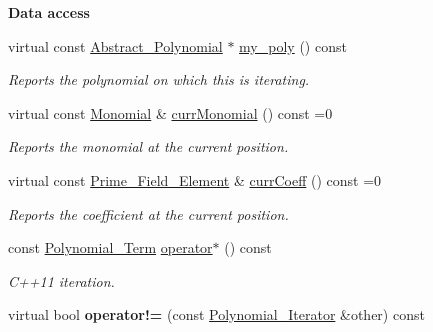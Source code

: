 \begin{Indent}\textbf{ Data access}\par
\begin{DoxyCompactItemize}
\item 
\mbox{\label{group___iterator_group_a7c21bc208d7a71c4a806c4abd1dcf05f}} 
virtual const \hyperlink{group__polygroup_class_abstract___polynomial}{Abstract\+\_\+\+Polynomial} $\ast$ \hyperlink{group___iterator_group_a7c21bc208d7a71c4a806c4abd1dcf05f}{my\+\_\+poly} () const
\begin{DoxyCompactList}\small\item\em Reports the polynomial on which {\ttfamily this} is iterating. \end{DoxyCompactList}\item 
\mbox{\label{group___iterator_group_a95408f0c39ca1cec17dd7802337fe028}} 
virtual const \hyperlink{group__polygroup_class_monomial}{Monomial} \& \hyperlink{group___iterator_group_a95408f0c39ca1cec17dd7802337fe028}{curr\+Monomial} () const =0
\begin{DoxyCompactList}\small\item\em Reports the monomial at the current position. \end{DoxyCompactList}\item 
\mbox{\label{group___iterator_group_a92a7e8c4e0054153a2554c8009536405}} 
virtual const \hyperlink{group___fields_group_class_prime___field___element}{Prime\+\_\+\+Field\+\_\+\+Element} \& \hyperlink{group___iterator_group_a92a7e8c4e0054153a2554c8009536405}{curr\+Coeff} () const =0
\begin{DoxyCompactList}\small\item\em Reports the coefficient at the current position. \end{DoxyCompactList}\item 
\mbox{\label{group___iterator_group_a119cd2937a0cacd43585dee8dc95505f}} 
const \hyperlink{group___iterator_group_class_polynomial___term}{Polynomial\+\_\+\+Term} \hyperlink{group___iterator_group_a119cd2937a0cacd43585dee8dc95505f}{operator$\ast$} () const
\begin{DoxyCompactList}\small\item\em C++11 iteration. \end{DoxyCompactList}\item 
\mbox{\label{group___iterator_group_a55bdf643502d14fc6d59df65465d21cd}} 
virtual bool {\bfseries operator!=} (const \hyperlink{group___iterator_group_class_polynomial___iterator}{Polynomial\+\_\+\+Iterator} \&other) const
\end{DoxyCompactItemize}
\end{Indent}
